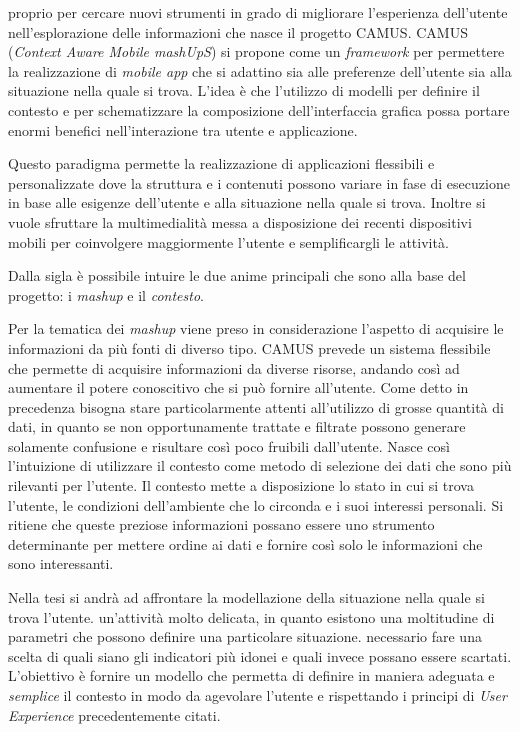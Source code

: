 \upe proprio per cercare nuovi strumenti in grado di migliorare l'esperienza dell'u\-ten\-te nell'esplorazione delle informazioni che nasce il progetto CAMUS. CAMUS (\emph{Context Aware Mobile mashUpS}) si propone come un \emph{framework} per permettere la realizzazione di \emph{mobile app} che si adattino sia alle preferenze dell'utente sia alla situazione nella quale si trova. L'idea è che l'utilizzo di modelli per definire il contesto e per schematizzare la composizione dell'interfaccia grafica possa portare enormi benefici nell'interazione tra utente e applicazione.

Questo paradigma permette la realizzazione di applicazioni flessibili e personalizzate dove la struttura e i contenuti possono variare in fase di esecuzione in base alle esigenze dell'utente e alla situazione nella quale si trova. Inoltre si vuole sfruttare la multimedialità messa a disposizione dei recenti dispositivi mobili per coinvolgere maggiormente l'utente e semplificargli le attività.

Dalla sigla è possibile intuire le due anime principali che sono alla base del progetto: i \emph{mashup} e il \emph{contesto}.

Per la tematica dei \emph{mashup} viene preso in considerazione l'aspetto di acquisire le informazioni da più fonti di diverso tipo. CAMUS prevede un sistema flessibile che permette di acquisire informazioni da diverse risorse, andando così ad aumentare il potere conoscitivo che si può fornire all'utente. Come detto in precedenza bisogna stare particolarmente attenti all'utilizzo di grosse quantità di dati, in quanto se non opportunamente trattate e filtrate possono generare solamente confusione e risultare così poco fruibili dall'utente. Nasce così l'intuizione di utilizzare il contesto come metodo di selezione dei dati che sono più rilevanti per l'utente. Il contesto mette a disposizione lo stato in cui si trova l'utente, le condizioni dell'ambiente che lo circonda e i suoi interessi personali. Si ritiene che queste preziose informazioni possano essere uno strumento determinante per mettere ordine ai dati e fornire così solo le informazioni che sono interessanti.

Nella tesi si andrà ad affrontare la modellazione della situazione nella quale si trova l'utente. \upe un'attività molto delicata, in quanto esistono una moltitudine di parametri che possono definire una particolare situazione. \upe necessario fare una scelta di quali siano gli indicatori più idonei e quali invece possano essere scartati. L'obiettivo è fornire un modello che permetta di definire in maniera adeguata e \emph{semplice} il contesto in modo da agevolare l'utente e rispettando i principi di \emph{User Experience} precedentemente citati.

